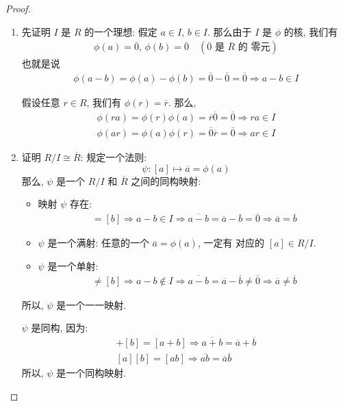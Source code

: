 \documentclass[utf8]{ctexbook}
\begin{document}
\begin{proof}
\begin{enumerate}
\item{先证明 $I$ 是 $R$ 的一个理想: 假定 $a \in I$, $b \in I$. 那么由于 $I$ 是 $\phi$ 的核, 我们有
\begin{align*}
\phi(a) =  \overline{0}, \, \phi(b) = \overline{0} \quad (\overline{0} \mbox{ 是 $\overline{R}$ 的 零元})
\end{align*}
也就是说 
\begin{align*}
\phi(a-b) = \phi(a) - \phi(b) =  \overline{0} - \overline{0} = \overline{0} \Longrightarrow a - b \in I
\end{align*}

假设任意 $r \in R$, 我们有 $\phi(r) = \overline{r}$. 那么,
\begin{align*}
\phi(ra) = \phi(r) \phi(a) =  \overline{r} \overline{0} = \overline{0} \Longrightarrow ra \in I \\
\phi(ar) = \phi(a) \phi(r) = \overline{0} \overline{r} = \overline{0} \Longrightarrow ar \in I
\end{align*}
}
\item{证明 $R/I \cong \overline{R}$: 规定一个法则:
\begin{equation}
\psi : [a] \mapsto \overline{a} = \phi(a)
\end{equation}
那么, $\psi$ 是一个 $R/I$ 和 $\overline{R}$ 之间的同构映射:
\begin{itemize}
\item{映射 $\psi$ 存在: 
\begin{align*}
[a] = [b] \Longrightarrow a - b \in I \Longrightarrow \overline{a - b} = \overline{a} - \overline{b} = \overline{0} \Longrightarrow \overline{a} = \overline{b} 
\end{align*}
}
\item{$\psi$ 是一个满射:
任意的一个 $\overline{a} = \phi(a)$, 一定有 对应的 $[a] \in R/I$.
}
\item{$\psi$ 是一个单射:
\begin{align*}
[a] \neq [b] \Longrightarrow a - b \not \in I \Longrightarrow \overline{a - b} = \overline{a} - \overline{b} \neq \overline{0} \Longrightarrow \overline{a} \neq \overline{b} 
\end{align*}
}
\end{itemize}

所以, $\psi$ 是一个一一映射. 

$\psi$ 是同构, 因为:
\begin{align*}
[a] + [b] = [a+b] \Longrightarrow \overline{a+b} = \overline{a} + \overline{b} \\
[a][b] = [ab] \Longrightarrow \overline{ab} = \overline{a} \overline{b}
\end{align*}
所以, $\psi$ 是一个同构映射.
}
\end{enumerate}
\end{proof}
\end{document}

